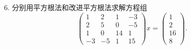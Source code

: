 \documentclass[11pt, a4paper]{ctexart}
\begin{document}
\begin{problem}{6. 分别用平方根法和改进平方根法求解方程组}
    \[
        \begin{pmatrix}
            1 & 2 & 1 & -3 \\
            2 & 5 & 0 & -5 \\
            1 & 0 & 14 & 1 \\
            -3 & -5 & 1 & 15
        \end{pmatrix}
        x
        =
        \begin{pmatrix}
            1 \\
            2 \\
            16 \\
            8
        \end{pmatrix}.
    \]
\end{problem}
\end{document}
